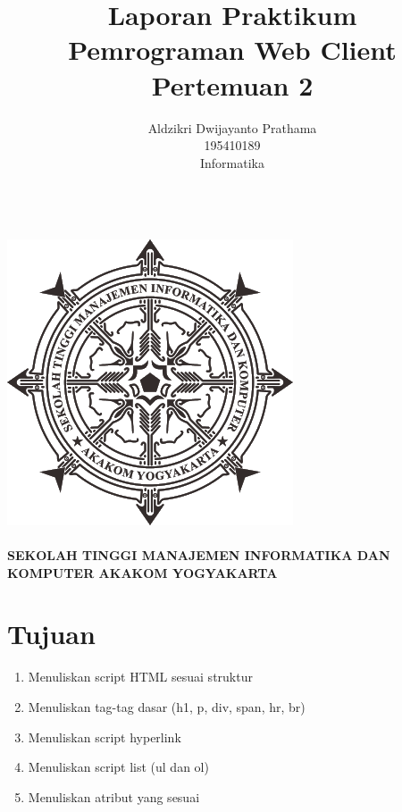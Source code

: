 \documentclass[a4paper,12pt]{article}
\begin{document}
\title{ {\Large Laporan Praktikum}\\ Pemrograman Web Client\\{\Large Pertemuan 2}}

\author{Aldzikri Dwijayanto Prathama 
	\\195410189
	\\Informatika}
\makeatletter
\begin{titlepage}
	\begin{center}
		{\huge \bfseries \@title }\\[14ex]
		\includegraphics[scale=.8]{logo}\\[4ex]
		{\large \@author}\\[12ex]
		{\large \bfseries {SEKOLAH TINGGI MANAJEMEN INFORMATIKA DAN KOMPUTER
				AKAKOM YOGYAKARTA}}
	\end{center}


\end{titlepage}
\makeatother
\newpage
\tableofcontents
\newpage
\section{Tujuan}
\begin{enumerate}
    \item Menuliskan script HTML sesuai struktur
    \item Menuliskan tag-tag dasar (h1, p, div, span, hr, br)
    \item Menuliskan script hyperlink
    \item Menuliskan script list (ul dan ol)
    \item Menuliskan atribut yang sesuai
\end{enumerate}
\end{document}

